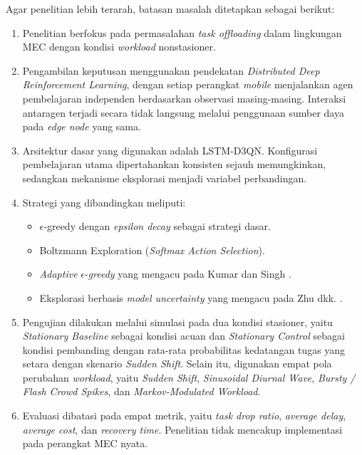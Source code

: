 Agar penelitian lebih terarah, batasan masalah ditetapkan sebagai berikut:
\begin{enumerate}[leftmargin=*, itemsep=0.2ex, parsep=0pt, topsep=0.2ex]
	\item Penelitian berfokus pada permasalahan \textit{task offloading} dalam lingkungan MEC dengan kondisi \textit{workload} nonstasioner.
	\item Pengambilan keputusan menggunakan pendekatan \textit{Distributed Deep Reinforcement Learning}, dengan setiap perangkat \textit{mobile} menjalankan agen pembelajaran independen berdasarkan observasi masing-masing. Interaksi antaragen terjadi secara tidak langsung melalui penggunaan sumber daya pada \textit{edge node} yang sama.
	\item Arsitektur dasar yang digunakan adalah LSTM-D3QN. Konfigurasi pembelajaran utama dipertahankan konsisten sejauh memungkinkan, sedangkan mekanisme eksplorasi menjadi variabel perbandingan.
	\item Strategi yang dibandingkan meliputi:
	\begin{itemize}[leftmargin=*, itemsep=0pt, parsep=0pt, topsep=0.2ex]
		\item $\epsilon$-greedy dengan \textit{epsilon decay} sebagai strategi dasar.
		\item Boltzmann Exploration (\textit{Softmax Action Selection}).
		\item \textit{Adaptive} $\epsilon$-\textit{greedy} yang mengacu pada Kumar dan Singh \cite{kumar2024adaptive}.
		\item Eksplorasi berbasis \textit{model uncertainty} yang mengacu pada Zhu dkk. \cite{zhu2022adaptive}.
	\end{itemize}
	\item Pengujian dilakukan melalui simulasi pada dua kondisi stasioner, yaitu \textit{Stationary Baseline} sebagai kondisi acuan dan \textit{Stationary Control} sebagai kondisi pembanding dengan rata-rata probabilitas kedatangan tugas yang setara dengan skenario \textit{Sudden Shift}. Selain itu, digunakan empat pola perubahan \textit{workload}, yaitu \textit{Sudden Shift}, \textit{Sinusoidal Diurnal Wave}, \textit{Bursty / Flash Crowd Spikes}, dan \textit{Markov-Modulated Workload}.
	\item Evaluasi dibatasi pada empat metrik, yaitu \textit{task drop ratio}, \textit{average delay}, \textit{average cost}, dan \textit{recovery time}. Penelitian tidak mencakup implementasi pada perangkat MEC nyata.
\end{enumerate}


